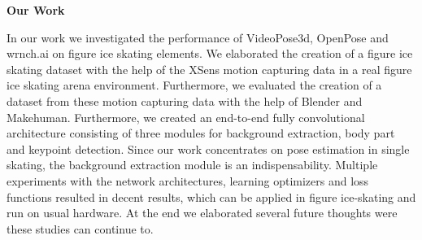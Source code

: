 \begin{flushleft}
    \textbf{Our Work} \par
    In our work we investigated the performance of VideoPose3d, OpenPose and wrnch.ai on figure ice skating elements.
    We elaborated the creation of a figure ice skating dataset with the help of the XSens motion capturing data in a real figure ice skating arena
    environment. Furthermore, we evaluated the creation of a dataset from these motion capturing data with the help of Blender and Makehuman.
    Furthermore, we created an end-to-end fully convolutional architecture consisting of three modules for background extraction,
    body part and keypoint detection. Since our work concentrates on pose estimation in single skating, the background extraction module is
    an indispensability.
    Multiple experiments with the network architectures, learning optimizers and loss functions resulted in decent results, which can be applied
    in figure ice-skating and run on usual hardware.
    At the end we elaborated several future thoughts were these studies can continue to.
\end{flushleft}


